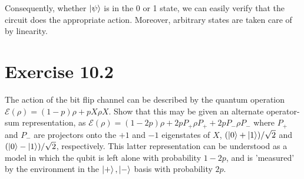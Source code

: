 \documentclass{book}
\newcommand{\mc}[1]{\mathcal{#1}}
\begin{document}
    Consequently, whether $\ket{\psi}$ is in the 0 or 1 state, we can easily verify that the circuit does the appropriate action. Moreover, arbitrary states are taken care of by linearity. 

\section*{Exercise 10.2}
    The action of the bit flip channel can be described by the quantum operation $\mc{E}(\rho) = (1-p)\rho + p X\rho X$. Show that this may be given an alternate operator-sum representation, as $\mc{E}(\rho) = (1-2p)\rho + 2p P_+ \rho P_+ + 2p P_- \rho P_-$ where $P_+$ and $P_-$ are projectors onto the $+1$ and $-1$ eigenstates of $X$, $(\ket{0}+\ket{1})/\sqrt{2}$ and $(\ket{0}-\ket{1})/\sqrt{2}$, respectively. This latter representation can be understood as a model in which the qubit is left alone with probability $1-2p$, and is 'measured' by the environment in the $\ket{+}, \ket{-}$ basis with probability $2p$.
    
\end{document}
